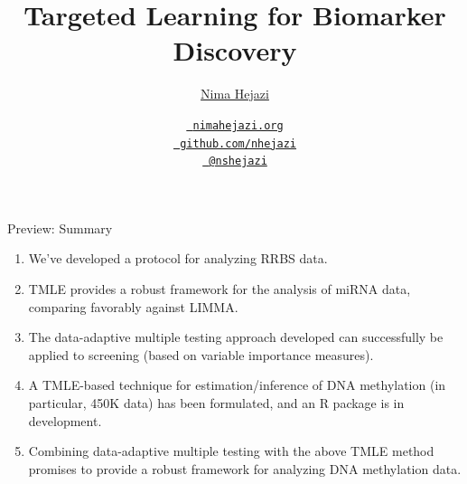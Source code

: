 \documentclass[12pt,t]{beamer}
\title{Targeted Learning for Biomarker Discovery}
\author{\href{http://nimahejazi.org}{Nima Hejazi}}
\institute{Division of Biostatistics \\
           University of California, Berkeley \\
           \url{https://www.stat.berkeley.edu/~nhejazi}
          }
\date{
  \href{http://nimahejazi.org}
      {\tt \scriptsize \color{foreground} nimahejazi.org}
  \\[-4pt]
  \href{https://github.com/nhejazi}
      {\tt \scriptsize \color{foreground} github.com/nhejazi}
  \\[-4pt]
  \href{https://twitter.com/nshejazi}
      {\tt \scriptsize \color{foreground} @nshejazi}
}
\begin{document}
{
}


\begin{frame}[c]{Preview: Summary}

  \begin{enumerate}
  	\itemsep12pt
  	\item We've developed a protocol for analyzing RRBS data.
  	\item TMLE provides a robust framework for the analysis of
          miRNA data, comparing favorably against LIMMA.
  	\item The data-adaptive multiple testing approach developed
          can successfully be applied to screening (based on
          variable importance measures).
  	\item A TMLE-based technique for estimation/inference of DNA
          methylation (in particular, 450K data) has been
          formulated, and an R package is in development.
  	\item Combining data-adaptive multiple testing with the above
    	  TMLE method promises to provide a robust framework for
          analyzing DNA methylation data.
  \end{enumerate}


\end{frame}
\end{document}
